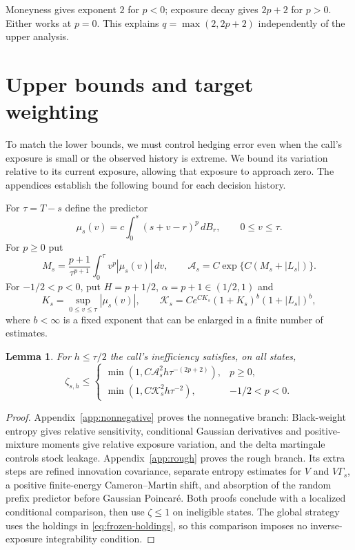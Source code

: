 \documentclass[11pt,a4paper]{amsart}
\theoremstyle{plain}
\newtheorem{lemma}[theorem]{Lemma}
\theoremstyle{definition}
\theoremstyle{remark}
\begin{document}
Moneyness gives exponent $2$ for $p<0$; exposure decay gives $2p+2$ for $p>0$. Either works at $p=0$. This explains $q=\max(2,2p+2)$ independently of the upper analysis.

\section{Upper bounds and target weighting}\label{sec:upper}

To match the lower bounds, we must control hedging error even when the call's exposure is small or the observed history is extreme. We bound its variation relative to its current exposure, allowing that exposure to approach zero. The appendices establish the following bound for each decision history.

For $\tau=T-s$ define the predictor
\[
 \mu_s(v)=c\int_0^s(s+v-r)^p\,dB_r,\qquad 0\le v\le\tau.
\]
For $p\ge0$ put
\begin{equation}\label{eq:nonnegative-envelope}
 M_s=\frac{p+1}{\tau^{p+1}}\int_0^\tau v^p|\mu_s(v)|\,dv,
 \qquad \mathcal A_s=C\exp\{C(M_s+|L_s|)\}.
\end{equation}
For $-1/2<p<0$, put $H=p+1/2$, $\alpha=p+1\in(1/2,1)$ and
\begin{equation}\label{eq:rough-envelope}
 K_s=\sup_{0\le v\le\tau}|\mu_s(v)|,
 \qquad \mathcal K_s=C e^{CK_s}(1+K_s)^b(1+|L_s|)^b,
\end{equation}
where $b<\infty$ is a fixed exponent that can be enlarged in a finite number of estimates.

\begin{lemma}\label{lem:statewise}
For $h\le\tau/2$ the call's inefficiency satisfies, on all states,
\begin{equation}\label{eq:statewise}
 \zeta_{s,h}\le
 \begin{cases}
 \min(1,C\mathcal A_s^2h\tau^{-(2p+2)}),&p\ge0,\\
 \min(1,C\mathcal K_s^2h\tau^{-2}),&-1/2<p<0.
 \end{cases}
\end{equation}
\end{lemma}
\begin{proof}
Appendix~\ref{app:nonnegative} proves the nonnegative branch: Black-weight entropy gives relative sensitivity, conditional Gaussian derivatives and positive-mixture moments give relative exposure variation, and the delta martingale controls stock leakage. Appendix~\ref{app:rough} proves the rough branch. Its extra steps are refined innovation covariance, separate entropy estimates for $V$ and $V\Gamma_s$, a positive finite-energy Cameron--Martin shift, and absorption of the random prefix predictor before Gaussian Poincar\'e. Both proofs conclude with a localized conditional comparison, then use $\zeta\le1$ on ineligible states. The global strategy uses the holdings in \eqref{eq:frozen-holdings}, so this comparison imposes no inverse-exposure integrability condition.
\end{proof}
\end{document}
